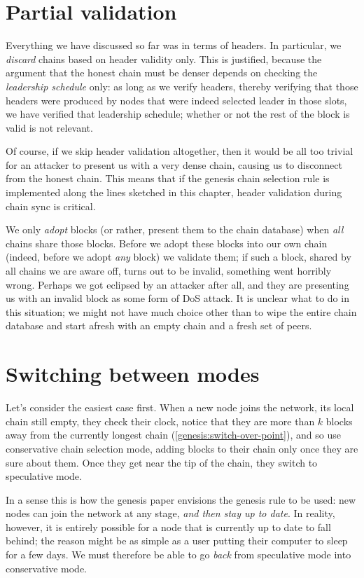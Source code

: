 \section{Partial validation}

Everything we have discussed so far was in terms of headers. In particular,
we \emph{discard} chains based on header validity only. This is justified,
because the argument that the honest chain must be denser depends on checking
the \emph{leadership schedule} only: as long as we verify headers, thereby
verifying that those headers were produced by nodes that were indeed selected
leader in those slots, we have verified that leadership schedule; whether or
not the rest of the block is valid is not relevant.

Of course, if we skip header validation altogether, then it would be all too
trivial for an attacker to present us with a very dense chain, causing us to
disconnect from the honest chain. This means that if  the genesis chain
selection rule is implemented along the lines sketched in this chapter, header
validation during chain sync is critical.

We only \emph{adopt} blocks (or rather, present them to the chain database) when
\emph{all} chains share those blocks. Before we adopt these blocks into our own
chain (indeed, before we adopt \emph{any} block) we validate them; if such a
block, shared by all chains we are aware off, turns out to be invalid, something
went horribly wrong. Perhaps we got eclipsed by an attacker after all, and they
are presenting us with an invalid block as some form of DoS attack. It is
unclear what to do in this situation; we might not have much choice other than
to wipe the entire chain database and start afresh with an empty chain and a
fresh set of peers.

\section{Switching between modes}
\label{genesis:switching-modes}

Let's consider the easiest case first. When a new node joins the network, its
local chain still empty, they check their clock, notice that they are more than
$k$ blocks away from the currently longest chain
(\cref{genesis:switch-over-point}), and so use conservative chain selection
mode, adding blocks to their chain only once they are sure about them. Once they
get near the tip of the chain, they switch to speculative mode.

In a sense this is how the genesis paper envisions the genesis rule to be used:
new nodes can join the network at any stage, \emph{and then stay up to date}.
In reality, however, it is entirely possible for a node that is currently up
to date to fall behind; the reason might be as simple as a user putting
their computer to sleep for a few days. We must therefore be able to go
\emph{back} from speculative mode into conservative mode.

